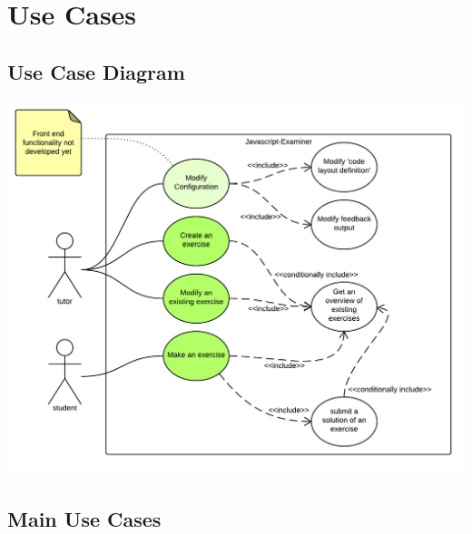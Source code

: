 \section{Use Cases}

\subsection{Use Case Diagram}
\includegraphics[scale=1.2]{appendices/diagrams-images/use-case-diagram}

\subsection{Main Use Cases}

